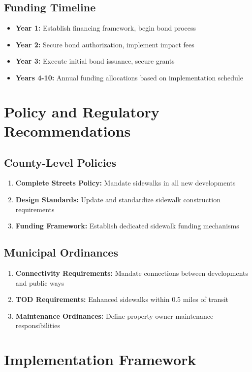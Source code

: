 \documentclass[11pt,letterpaper]{report}
\begin{document}
\subsection{Funding Timeline}
\begin{itemize}
    \item \textbf{Year 1:} Establish financing framework, begin bond process
    \item \textbf{Year 2:} Secure bond authorization, implement impact fees
    \item \textbf{Year 3:} Execute initial bond issuance, secure grants
    \item \textbf{Years 4-10:} Annual funding allocations based on implementation schedule
\end{itemize}

\section{Policy and Regulatory Recommendations}

\subsection{County-Level Policies}
\begin{enumerate}
    \item \textbf{Complete Streets Policy:} Mandate sidewalks in all new developments
    \item \textbf{Design Standards:} Update and standardize sidewalk construction requirements
    \item \textbf{Funding Framework:} Establish dedicated sidewalk funding mechanisms
\end{enumerate}

\subsection{Municipal Ordinances}
\begin{enumerate}
    \item \textbf{Connectivity Requirements:} Mandate connections between developments and public ways
    \item \textbf{TOD Requirements:} Enhanced sidewalks within 0.5 miles of transit
    \item \textbf{Maintenance Ordinances:} Define property owner maintenance responsibilities
\end{enumerate}

\section{Implementation Framework}
\end{document}
